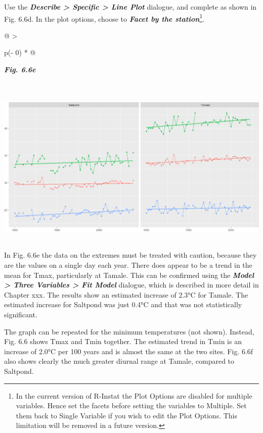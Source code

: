 \documentclass[
  letterpaper,
  DIV=11,
  numbers=noendperiod]{scrreprt}
\begin{document}
Use the \textbf{\emph{Describe \textgreater{} Specific \textgreater{}
Line Plot}} dialogue, and complete as shown in Fig. 6.6d. In the plot
options, choose to \textbf{\emph{Facet by the station}}\footnote{In the
  current version of R-Instat the Plot Options are disabled for multiple
  variables. Hence set the facets before setting the variables to
  Multiple. Set them back to Single Variable if you wish to edit the
  Plot Options. This limitation will be removed in a future version.}.

\begin{longtable}[]{@{}
  >{\raggedright\arraybackslash}p{(\columnwidth - 0\tabcolsep) * }@{}}
\toprule\noalign{}
\begin{minipage}[b]{\linewidth}\raggedright
\textbf{\emph{Fig. 6.6e}}
\end{minipage} \\
\midrule\noalign{}
\endhead
\bottomrule\noalign{}
\endlastfoot
\includegraphics[width=5.98585in,height=3.0798in]{figures/Fig6.6e.png} \\
\end{longtable}

In Fig. 6.6e the data on the extremes must be treated with caution,
because they are the values on a single day each year. There does appear
to be a trend in the mean for Tmax, particularly at Tamale. This can be
confirmed using the \textbf{\emph{Model \textgreater{} Three Variables
\textgreater{} Fit Model}} dialogue, which is described in more detail
in Chapter xxx. The results show an estimated increase of 2.3°C for
Tamale. The estimated increase for Saltpond was just 0.4°C and that was
not statistically significant.

The graph can be repeated for the minimum temperatures (not shown).
Instead, Fig. 6.6 shows Tmax and Tmin together. The estimated trend in
Tmin is an increase of 2.0°C per 100 years and is almost the same at the
two sites. Fig. 6.6f also shows clearly the much greater diurnal range
at Tamale, compared to Saltpond.
\end{document}
